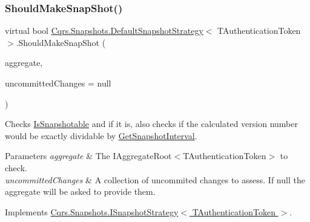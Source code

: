 \subsubsection{\texorpdfstring{Should\+Make\+Snap\+Shot()}{ShouldMakeSnapShot()}}
{\footnotesize\ttfamily virtual bool \hyperlink{classCqrs_1_1Snapshots_1_1DefaultSnapshotStrategy}{Cqrs.\+Snapshots.\+Default\+Snapshot\+Strategy}$<$ T\+Authentication\+Token $>$.Should\+Make\+Snap\+Shot (\begin{DoxyParamCaption}\item[{\hyperlink{interfaceCqrs_1_1Domain_1_1IAggregateRoot}{I\+Aggregate\+Root}$<$ T\+Authentication\+Token $>$}]{aggregate,  }\item[{I\+Enumerable$<$ \hyperlink{interfaceCqrs_1_1Events_1_1IEvent}{I\+Event}$<$ T\+Authentication\+Token $>$$>$}]{uncommitted\+Changes = {\ttfamily null} }\end{DoxyParamCaption})\hspace{0.3cm}{\ttfamily [virtual]}}



Checks \hyperlink{classCqrs_1_1Snapshots_1_1DefaultSnapshotStrategy_acdbb918ac01b526aedb5fa9a3879887a_acdbb918ac01b526aedb5fa9a3879887a}{Is\+Snapshotable} and if it is, also checks if the calculated version number would be exactly dividable by \hyperlink{classCqrs_1_1Snapshots_1_1DefaultSnapshotStrategy_a3540a6d621d8c23816da761f929d83a7_a3540a6d621d8c23816da761f929d83a7}{Get\+Snapshot\+Interval}. 


\begin{DoxyParams}{Parameters}
{\em aggregate} & The I\+Aggregate\+Root$<$\+T\+Authentication\+Token$>$ to check.\\
\hline
{\em uncommitted\+Changes} & A collection of uncommited changes to assess. If null the aggregate will be asked to provide them.\\
\hline
\end{DoxyParams}


Implements \hyperlink{interfaceCqrs_1_1Snapshots_1_1ISnapshotStrategy_aeb5fc714ec8a5b60219426f3aabc0f6c_aeb5fc714ec8a5b60219426f3aabc0f6c}{Cqrs.\+Snapshots.\+I\+Snapshot\+Strategy$<$ T\+Authentication\+Token $>$}.

